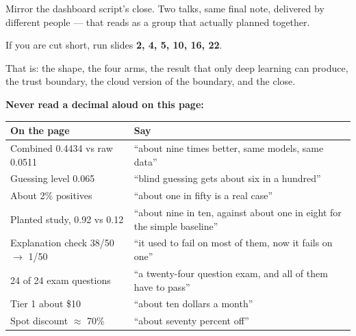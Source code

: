 \documentclass[11pt]{article}
\begin{document}
\begin{means}
Mirror the dashboard script's close. Two talks, same final note, delivered by
different people --- that reads as a group that actually planned together.
\end{means}


If you are cut short, run slides \textbf{2, 4, 5, 10, 16, 22}.

That is: the shape, the four arms, the result that only deep learning can
produce, the trust boundary, the cloud version of the boundary, and the close.

\vspace{8pt}
\textbf{Never read a decimal aloud on this page:}

\begin{center}\small
\begin{tabular}{@{}p{6.2cm}p{8.4cm}@{}}
\hline
\textbf{On the page} & \textbf{Say} \\
\hline
Combined 0.4434 vs raw 0.0511 & ``about nine times better, same models, same
data'' \\
Guessing level 0.065 & ``blind guessing gets about six in a hundred'' \\
About 2\% positives & ``about one in fifty is a real case'' \\
Planted study, 0.92 vs 0.12 & ``about nine in ten, against about one in eight
for the simple baseline'' \\
Explanation check 38/50 $\to$ 1/50 & ``it used to fail on most of them, now it
fails on one'' \\
24 of 24 exam questions & ``a twenty-four question exam, and all of them have
to pass'' \\
Tier 1 about \$10 & ``about ten dollars a month'' \\
Spot discount $\approx$ 70\% & ``about seventy percent off'' \\
\hline
\end{tabular}
\end{center}
\end{document}
